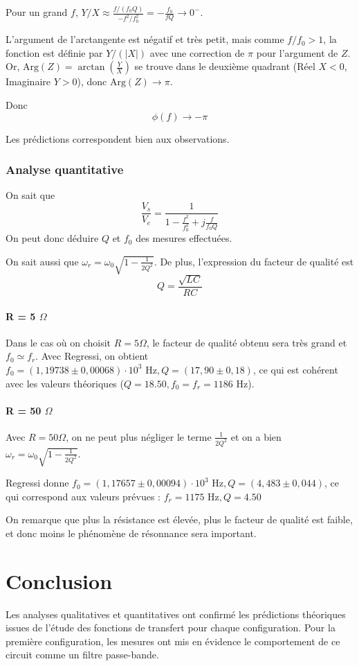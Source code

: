 \documentclass[a4paper,9pt,french]{scrartcl}
\begin{document}
Pour un grand $f$, $Y/X \approx \frac{f/(f_0 Q)}{-f^2/f_0^2} = - \frac{f_0}{f Q} \to 0^-$.

L'argument de l'arctangente est négatif et très petit, mais comme $f/f_0 > 1$, la fonction est définie par $Y/(|X|)$ avec une correction de $\pi$ pour l'argument de $Z$. Or, $\text{Arg}(Z) = \arctan\left(\frac{Y}{X}\right)$ se trouve dans le deuxième quadrant (Réel $X<0$, Imaginaire $Y>0$), donc $\text{Arg}(Z) \to \pi$.

Donc $$\phi(f) \to - \pi $$

Les prédictions correspondent bien aux observations.
\subsubsection{Analyse quantitative}
On sait que
\begin{equation}
 \frac{V_s}{V_e} = \frac{1}{1-\frac{f^2}{f_0^2}+j\frac{f}{f_0Q}}
\end{equation}
On  peut donc déduire \(Q\) et \(f_0\) des mesures effectuées.

On sait aussi que \(\omega_r = \omega_0\sqrt{1-\frac{1}{2Q^2}}\). De plus, l'expression du facteur de qualité est \[Q = \frac{\sqrt{LC}}{RC}\]
\paragraph{R = 5 \(\Omega\)}


Dans le cas où on choisit \(R=5\Omega\), le facteur de qualité obtenu sera très grand et \(f_0 \simeq f_r\). Avec Regressi, on obtient \(f_0 = (1,19738 \pm 0,00068)\cdot 10^3\text{ Hz}, Q = (17,90 \pm0,18) \), ce qui est cohérent avec les valeurs théoriques (\(Q = 18.50, f_0 = f_r = 1186 \text{ Hz}\)).

\paragraph{R = 50 \(\Omega\)}
Avec \(R = 50 \Omega\), on ne peut plus négliger le terme \(\frac{1}{2Q^2}\) et on a bien \(\omega_r = \omega_0\sqrt{1-\frac{1}{2Q^2}}\).

Regressi donne $f_0=(1,17657 \pm0,00094)\cdot 10^3 \text{ Hz}, Q=(4,483 \pm0,044)$, ce qui correspond aux valeurs prévues : \(f_r = 1175 \text{ Hz}, Q = 4.50\)


On remarque que plus la résistance est élevée, plus le facteur de qualité est faible, et donc moins le phénomène de résonnance sera important.
\section{Conclusion}
Les analyses qualitatives et quantitatives ont confirmé les prédictions théoriques issues de l'étude des fonctions de transfert pour chaque configuration.
Pour la première configuration, les mesures ont mis en évidence le comportement de ce circuit comme un filtre passe-bande.
\end{document}
